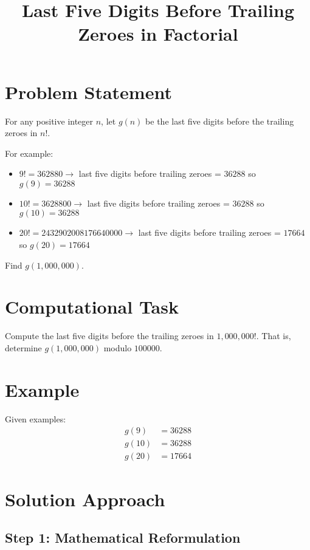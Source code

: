\documentclass[12pt]{article}
\title{Last Five Digits Before Trailing Zeroes in Factorial}
\author{}
\date{}
\begin{document}
\maketitle

\section*{Problem Statement}

For any positive integer $n$, let $g(n)$ be the last five digits before the trailing zeroes in $n!$.  

For example:
\begin{itemize}
    \item $9! = 362880 \rightarrow$ last five digits before trailing zeroes = $36288$ so $g(9) = 36288$
    \item $10! = 3628800 \rightarrow$ last five digits before trailing zeroes = $36288$ so $g(10) = 36288$
    \item $20! = 2432902008176640000 \rightarrow$ last five digits before trailing zeroes = $17664$ so $g(20) = 17664$
\end{itemize}

Find $g(1,000,000)$.

\section*{Computational Task}

Compute the last five digits before the trailing zeroes in $1,000,000!$.  
That is, determine $g(1,000,000)$ modulo $100000$.

\section*{Example}

Given examples:
\begin{align*}
g(9) &= 36288 \\
g(10) &= 36288 \\
g(20) &= 17664
\end{align*}

\section*{Solution Approach}

\subsection*{Step 1: Mathematical Reformulation}
\end{document}
